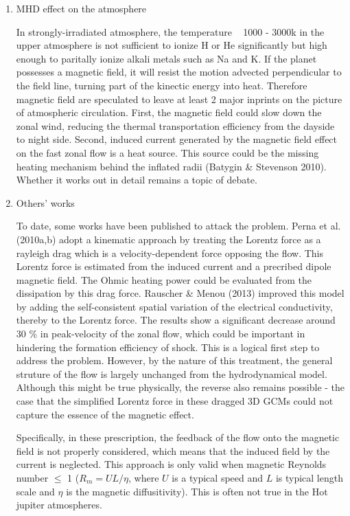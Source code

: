 \documentclass[11pt]{article}
\begin{document}
\begin{enumerate}
\item MHD effect on the atmosphere

In strongly-irradiated atmosphere, the temperature ~ 1000 - 3000k in the upper atmosphere is not sufficient to ionize H or He significantly but high enough to paritally ionize alkali metals such as Na and K. If the planet possesses a magnetic field, it will resist the motion advected perpendicular to the field line, turning part of the kinectic energy into heat. Therefore magnetic field are speculated to leave at least 2 major inprints on the picture of atmospheric circulation. First, the magnetic field could slow down the zonal wind, reducing the thermal transportation efficiency from the dayside to night side. Second, induced current generated by the magnetic field effect on the fast zonal flow is a heat source.  This source could be the missing heating mechanism behind the inflated radii (Batygin \& Stevenson 2010). Whether it works out in detail remains a topic of debate. 


\item Others' works

To date, some works have been published to attack the problem. Perna et al. (2010a,b) adopt a kinematic approach by treating the Lorentz force as a rayleigh drag which is a velocity-dependent force opposing the flow. This Lorentz force is estimated from the induced current and a precribed dipole magnetic field. The Ohmic heating power could be evaluated from the dissipation by this drag force. Rauscher \& Menou (2013) improved this model by adding the self-consistent spatial variation of the electrical conductivity, thereby to the Lorentz force. The results show a significant decrease around ~ 30 \% in peak-velocity of the zonal flow, which could be important in hindering the formation efficiency of shock. This is a logical first step to address the problem. However, by the nature of this treatment, the general struture of the flow is largely unchanged from the hydrodynamical model. Although this might be true physically, the reverse also remains possible - the case that the simplified Lorentz force in these dragged 3D GCMs could not capture the essence of the magnetic effect. 

Specifically, in these prescription, the feedback of the flow onto the magnetic field is not properly considered, which means that the induced field by the current is neglected. This approach is only valid when magnetic Reynolds number $\leq$ 1 ($R_m = UL/\eta$, where  $U$ is a typical speed and $L$ is typical length scale and $\eta$ is the magnetic diffusitivity). This is often not true in the Hot jupiter atmospheres.


\end{enumerate}
\end{document}
